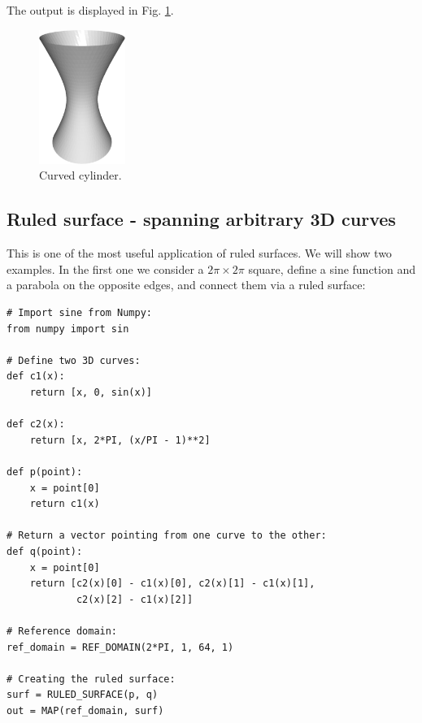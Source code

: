 \noindent
The output is displayed in Fig. \ref{fig:curves-9}.
\newpage

\begin{figure}[!ht]
\begin{center}
\includegraphics[width=0.25\textwidth]{img/curves-9.png}
\end{center}
\vspace{-4mm}
\caption{Curved cylinder.}
\label{fig:curves-9}
\end{figure}

\subsection{Ruled surface - spanning arbitrary 3D curves}

This is one of the most useful application of ruled surfaces.
We will show two examples. In the first one we consider 
a $2\pi \times 2\pi$ square, define a sine function and 
a parabola on the opposite edges, and connect them via 
a ruled surface:\\

\begin{bbox}
\begin{verbatim}
# Import sine from Numpy:
from numpy import sin

# Define two 3D curves:
def c1(x):
    return [x, 0, sin(x)]

def c2(x):
    return [x, 2*PI, (x/PI - 1)**2]
  
def p(point):
    x = point[0]
    return c1(x)
  
# Return a vector pointing from one curve to the other:
def q(point):
    x = point[0]
    return [c2(x)[0] - c1(x)[0], c2(x)[1] - c1(x)[1], 
            c2(x)[2] - c1(x)[2]]
  
# Reference domain:
ref_domain = REF_DOMAIN(2*PI, 1, 64, 1)

# Creating the ruled surface:
surf = RULED_SURFACE(p, q)
out = MAP(ref_domain, surf)
\end{verbatim}
\end{bbox}
\vspace{6mm}

